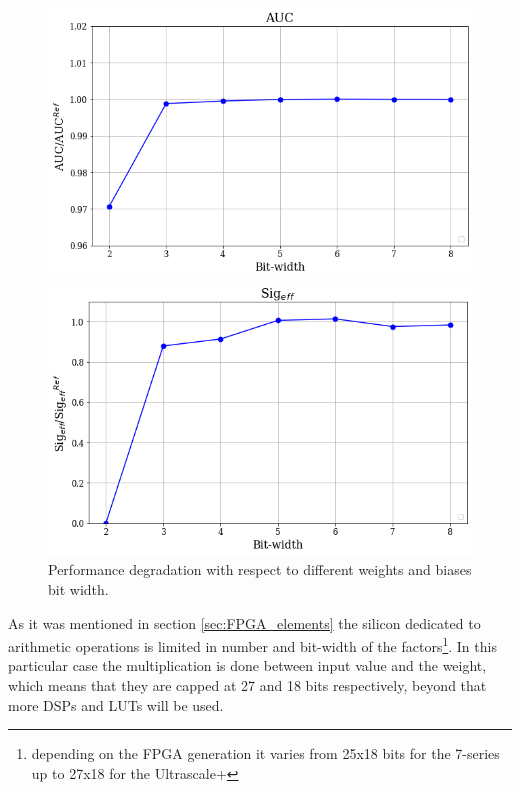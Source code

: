 \documentclass[../../main.tex]{subfiles}
\begin{document}
\begin{figure}[h] 
  \label{ fig7} 
  \begin{minipage}[b]{0.5\linewidth}
    \centering
    \includegraphics[width=.95\linewidth]{sections/05/Images/Quant_AUC_1ele.png} 
    \vspace{4ex}
  \end{minipage}%
  \begin{minipage}[b]{0.5\linewidth}
    \centering
    \includegraphics[width=.95\linewidth]{sections/05/Images/Quant_SigEff_1ele.png}
    \vspace{4ex}
  \end{minipage}
  \caption{Performance degradation with respect to different weights and biases bit width.} 
  \label{fig:quantization_plots}
\end{figure}

As it was mentioned in section \ref{sec:FPGA_elements} the silicon dedicated to arithmetic operations is limited in number and bit-width of the factors\footnote{depending on the FPGA generation it varies from 25x18 bits for the 7-series up to 27x18 for the Ultrascale+}.  
In this particular case the multiplication is done between input value and the weight, which means that they are capped at 27 and 18 bits respectively, beyond that more DSPs and LUTs will be used.   
\end{document}
